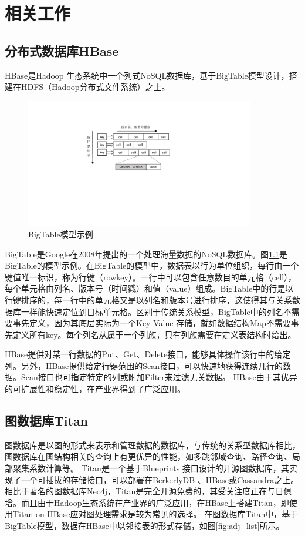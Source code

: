 
\chapter{相关工作}
\section{分布式数据库HBase}
HBase是Hadoop 生态系统中一个列式NoSQL数据库，基于BigTable\supercite{bigtable}模型设计，搭建在HDFS（Hadoop分布式文件系统）之上。

\begin{figure}[htbp]
\centering
\includegraphics[width=100mm]{fig/big_table.pdf}
\caption{BigTable模型示例}
\label{fig:big_table}
\end{figure}

BigTable是Google在2008年提出的一个处理海量数据的NoSQL数据库。图\ref{fig:big_table}是BigTable的模型示例。在BigTable的模型中，数据表以行为单位组织，每行由一个键值唯一标识，称为行键（rowkey）。一行中可以包含任意数目的单元格（cell），每个单元格由列名、版本号（时间戳）和值（value）组成。BigTable中的行是以行键排序的，每一行中的单元格又是以列名和版本号进行排序，这使得其与关系数据库一样能快速定位到目标单元格。区别于传统关系模型，BigTable中的列名不需要事先定义，因为其底层实际为一个Key-Value 存储，就如数据结构Map不需要事先定义所有key。每个列名从属于一个列族，只有列族需要在定义表结构时给出。

HBase提供对某一行数据的Put、Get、Delete接口，能够具体操作该行中的给定列。另外，HBase提供给定行键范围的Scan接口，可以快速地获得连续几行的数据。Scan接口也可指定特定的列或附加Filter来过滤无关数据。
HBase由于其优异的可扩展性和稳定性，在产业界得到了广泛应用。


\section{图数据库Titan}
图数据库是以图的形式来表示和管理数据的数据库\supercite{graph_models_survey}，与传统的关系型数据库相比，图数据库在图结构相关的查询上有更优异的性能，如多跳邻域查询、路径查询、局部聚集系数计算等。
Titan是一个基于Blueprints 接口设计的开源图数据库，其实现了一个可插拔的存储接口，可以部署在BerkerlyDB 、HBase或Cassandra\supercite{cassandra}之上。相比于著名的图数据库Neo4j\supercite{neo4j}，Titan是完全开源免费的，其受关注度正在与日俱增。而且由于Hadoop生态系统在产业界的广泛应用，在HBase上搭建Titan，即使用Titan on HBase应对图处理需求是较为常见的选择。
在图数据库Titan中，基于BigTable模型，数据在HBase中以邻接表的形式存储，如图\ref{fig:adj_list}所示。

